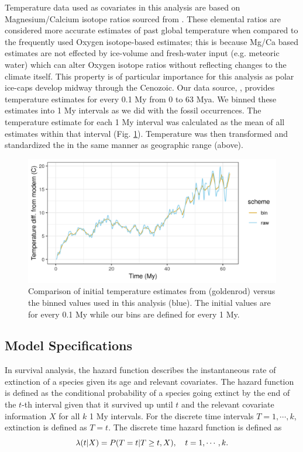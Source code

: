 \documentclass[12pt,letterpaper]{article}
\begin{document}
Temperature data used as covariates in this analysis are based on Magnesium/Calcium isotope ratios sourced from \citet{Cramer2011}. These elemental ratios are considered more accurate estimates of past global temperature when compared to the frequently used Oxygen isotope-based estimates; this is because Mg/Ca based estimates are not effected by ice-volume and fresh-water input (e.g. meteoric water) which can alter Oxygen isotope ratios without reflecting changes to the climate itself. This property is of particular importance for this analysis as polar ice-caps develop midway through the Cenozoic. Our data source, \citet{Cramer2011}, provides temperature estimates for every 0.1 My from 0 to 63 Mya. We binned these estimates into 1 My intervals as we did with the fossil occurrences. The temperature estimate for each 1 My interval was calculated as the mean of all estimates within that interval (Fig. \ref{fig:temp_curve}). Temperature was then transformed and standardized the in the same manner as geographic range (above).

\begin{figure}[ht]
  \centering
  \includegraphics[width=\textwidth,height=0.5\textheight,keepaspectratio=true]{../results/figure/cramer_temp}
  \caption{Comparison of initial temperature estimates from \citet{Cramer2011} (goldenrod) versus the binned values used in this analysis (blue). The initial values are for every 0.1 My while our bins are defined for every 1 My.}
  \label{fig:temp_curve}
\end{figure}


\subsection{Model Specifications}

In survival analysis, the hazard function describes the instantaneous rate of extinction of a species given its age and relevant covariates. The hazard function is defined as the conditional probability of a species going extinct by the end of the \(t\)-th interval given that it survived up until \(t\) and the relevant covariate information \(X\) for all \(k\) 1 My intervals. For the discrete time intervals \(T = 1, \cdots, k\), extinction is defined as \(T = t\). The discrete time hazard function is defined as
\begin{equation}
  \lambda(t | X) = P(T = t | T \geq t, X), \quad t = 1, \cdots, k. \\
  \label{eq:hazard}
\end{equation}
\end{document}
